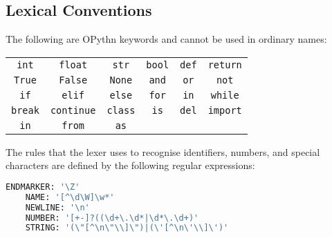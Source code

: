 \documentclass[11pt, twoside]{article}
\newcommand{\ms}{\texttt}
\begin{document}
    \subsection{Lexical Conventions}
    The following are OPythn keywords and cannot be used in ordinary names:
    \begin{center}
        \begin{tabular}{cccccc}
            \ms{int} & \ms{float} & \ms{str} & \ms{bool} & \ms{def} & \ms{return}\\
            \ms{True} & \ms{False} & \ms{None} & \ms{and} & \ms{or} & \ms{not}\\
            \ms{if} & \ms{elif} & \ms{else} & \ms{for} & \ms{in} & \ms{while}\\
            \ms{break} & \ms{continue} & \ms{class} & \ms{is} & \ms{del} & \ms{import}\\
            \ms{in} & \ms{from} & \ms{as} &&&
    \end{tabular}
    \end{center}
    The rules that the lexer uses to recognise identifiers, numbers, and special characters are defined by the following regular expressions:
    \begin{lstlisting}[language=python]
    ENDMARKER: '\Z'
    NAME: '[^\d\W]\w*'
    NEWLINE: '\n'
    NUMBER: '[+-]?((\d+\.\d*|\d*\.\d+)'
    STRING: '(\"[^\n\"\\]\")|(\'[^\n\'\\]\')'
    \end{lstlisting}
\end{document}
